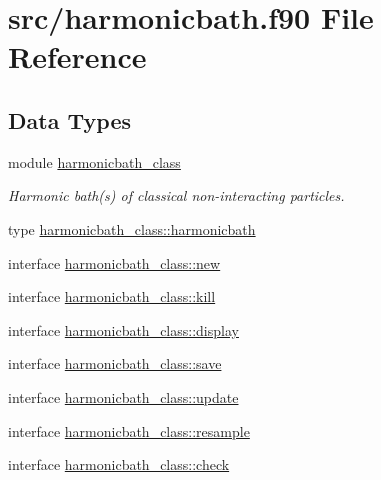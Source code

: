 \hypertarget{harmonicbath_8f90}{\section{src/harmonicbath.f90 File Reference}
\label{harmonicbath_8f90}
}
\subsection*{Data Types}
\begin{DoxyCompactItemize}
\item 
module \hyperlink{classharmonicbath__class}{harmonicbath\+\_\+class}
\begin{DoxyCompactList}\small\item\em Harmonic bath(s) of classical non-\/interacting particles. \end{DoxyCompactList}\item 
type \hyperlink{structharmonicbath__class_1_1harmonicbath}{harmonicbath\+\_\+class\+::harmonicbath}
\item 
interface \hyperlink{interfaceharmonicbath__class_1_1new}{harmonicbath\+\_\+class\+::new}
\item 
interface \hyperlink{interfaceharmonicbath__class_1_1kill}{harmonicbath\+\_\+class\+::kill}
\item 
interface \hyperlink{interfaceharmonicbath__class_1_1display}{harmonicbath\+\_\+class\+::display}
\item 
interface \hyperlink{interfaceharmonicbath__class_1_1save}{harmonicbath\+\_\+class\+::save}
\item 
interface \hyperlink{interfaceharmonicbath__class_1_1update}{harmonicbath\+\_\+class\+::update}
\item 
interface \hyperlink{interfaceharmonicbath__class_1_1resample}{harmonicbath\+\_\+class\+::resample}
\item 
interface \hyperlink{interfaceharmonicbath__class_1_1check}{harmonicbath\+\_\+class\+::check}
\end{DoxyCompactItemize}
